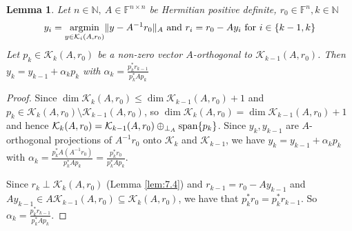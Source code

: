 \documentclass[12pt]{article}
\newtheorem{lemma}[theorem]{Lemma}
\theoremstyle{definition}
\theoremstyle{remark}
\numberwithin{equation}{section}
\newcommand{\F}{\mathbb{F}}
\newcommand{\N}{\mathbb{N}}
\newcommand{\K}{\mathcal{K}}
\DeclarePairedDelimiter{\norm}{\lVert}{\rVert}
\DeclarePairedDelimiter{\set}{\{}{\}}
\DeclareMathOperator{\mathspan}{span}
\DeclareMathOperator{\argmin}{argmin}
\begin{document}
\begin{lemma}
  \label{lem:7.6}
  Let $n \in \N,\ A \in \F^{n\times n}$ be Hermitian positive definite, $r_0 \in \F^n, k \in \N$
  \begin{equation*}
    y_i = \argmin_{y \in \K_i(A,r_0)} \norm{y - A^{-1} r_0}_A \text{ and } r_i = r_0 - A y_i \text{ for }i \in \set{k-1,k}
  \end{equation*}
  Let $p_k \in \K_k(A,r_0)$ be a non-zero vector $A$-orthogonal to $\K_{k-1}(A,r_0)$. Then $y_k = y_{k-1} + \alpha_k p_k$ with $\alpha_k = \frac{p_k^* r_{k-1}}{p_k^* A p_k}$
\end{lemma}
\begin{proof}
  Since $\dim \K_k(A,r_0) \leq \dim \K_{k-1}(A,r_0) + 1$ and $p_k \in \K_k(A,r_0) \setminus \K_{k-1}(A,r_0)$, so $\dim \K_k(A,r_0) = \dim \K_{k-1}(A,r_0) + 1$ and hence $\K_k(A,r_0) = \K_{k-1}(A,r_0) \oplus_{\perp_A} \mathspan \set{p_k}$. Since $y_k, y_{k-1} $ are $A$-orthogonal projections of $A^{-1} r_0$ onto $\K_k$ and $\K_{k-1}$, we have $y_k = y_{k-1} + \alpha_k p_k$ with $\alpha_k = \frac{p_k^* A (A^{-1} r_0)}{p_k^* A p_k} = \frac{p_k^* r_0}{p_k^* A p_k}$.

  Since $r_k \perp \K_k(A,r_0)$ (Lemma \ref{lem:7.4}) and $r_{k-1} = r_0 - A y_{k-1}$ and $A y_{k-1} \in A \K_{k-1}(A,r_0) \subseteq \K_k(A,r_0)$, we have that $p_k^* r_0 = p_k^* r_{k-1}$. So $\alpha_k = \frac{p_k^* r_{k-1}}{p_k^* A p_k}$.
\end{proof}
\end{document}
